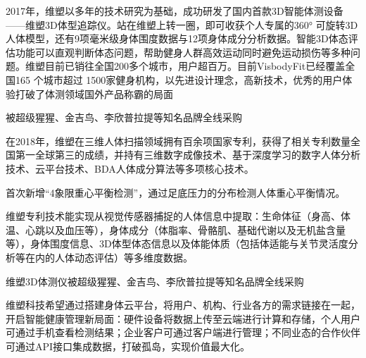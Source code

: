 \documentclass[letterpaper,11pt,english]{sphinxmanual}
\begin{document}
2017年，维塑以多年的技术研究为基础，成功研发了国内首款3D智能体测设备——维塑3D体型追踪仪。站在维塑上转一圈，即可收获个人专属的360°
可旋转3D人体模型，还有9项毫米级身体围度数据与12项身体成分分析数据。智能3D体态评估功能可以直观判断体态问题，帮助健身人群高效运动同时避免运动损伤等多种问题。维塑目前已销往全国200多个城市，用户超百万。目前VisbodyFit已经覆盖全国165
个城市超过
1500家健身机构，以先进设计理念，高新技术，优秀的用户体验打破了体测领域国外产品称霸的局面
%
\begin{footnote}[246]\sphinxAtStartFootnote
{}
%
\end{footnote}
被超级猩猩、金吉鸟、李欣普拉提等知名品牌全线采购
%
\begin{footnote}[247]\sphinxAtStartFootnote
{}
%
\end{footnote}

在2018年，维塑在三维人体扫描领域拥有百余项国家专利，获得了相关专利数量全国第一全球第三的成绩，并持有三维数字成像技术、基于深度学习的数字人体分析技术、云平台技术、BDA人体成分算法等多项核心技术。%
\begin{footnote}[248]\sphinxAtStartFootnote
{}
%
\end{footnote}

首次新增“4象限重心平衡检测”，通过足底压力的分布检测人体重心平衡情况。
%
\begin{footnote}[249]\sphinxAtStartFootnote
{}
%
\end{footnote}

维塑专利技术能实现从视觉传感器捕捉的人体信息中提取：生命体征（身高、体温、心跳以及血压等），身体成分（体脂率、骨骼肌、基础代谢以及无机盐含量等），身体围度信息、3D体型体态信息以及体能体质（包括体适能与关节灵活度分析等在内的人体动态评估）等多维度数据。

维塑3D体测仪被超级猩猩、金吉鸟、李欣普拉提等知名品牌全线采购

维塑科技希望通过搭建身体云平台，将用户、机构、行业各方的需求链接在一起，开启智能健康管理新局面：硬件设备将数据上传至云端进行计算和存储，个人用户可通过手机查看检测结果；企业客户可通过客户端进行管理；不同业态的合作伙伴可通过API接口集成数据，打破孤岛，实现价值最大化。%
\begin{footnote}[250]\sphinxAtStartFootnote
{}
%
\end{footnote}
\end{document}
